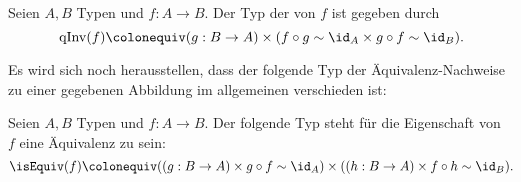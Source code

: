 \begin{definition}
  Seien $A,B$ Typen und $f:A\to B$. Der Typ der  von $f$ ist gegeben durch
  \[
    \mathrm{qInv}(f)\colonequiv (g:B\to A)\times (f\circ g\sim \id_A\times g\circ f\sim \id_B)\rlap{.}
  \]
\end{definition}

Es wird sich noch herausstellen, dass der folgende Typ der Äquivalenz-Nachweise zu einer gegebenen Abbildung im allgemeinen verschieden ist:

\begin{definition}
  Seien $A,B$ Typen und $f:A\to B$. Der folgende Typ steht für die Eigenschaft von $f$ eine Äquivalenz zu sein:
  \[
    \isEquiv(f) \colonequiv ((g:B\to A)\times g\circ f\sim\id_A )\times ((h:B\to A)\times f\circ h\sim\id_B)\rlap{.}
  \]
\end{definition}
